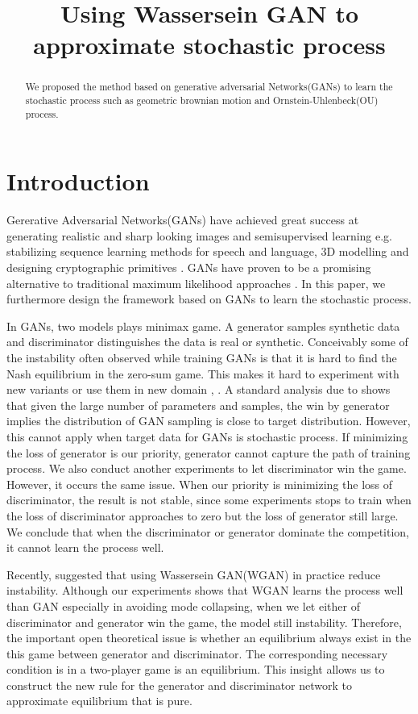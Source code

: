 \documentclass{article}
\title{Using Wassersein GAN to approximate stochastic process}
\begin{document}
	\maketitle
	\begin{abstract}
		We proposed the method based on generative adversarial Networks(GANs)
		to learn the stochastic process such as geometric brownian motion and Ornstein-Uhlenbeck(OU) process.
	\end{abstract}
		\section{Introduction}
		Gererative Adversarial Networks(GANs) have achieved great success at generating realistic and sharp looking images and semisupervised learning e.g. stabilizing sequence learning methods for speech and language, 3D modelling and designing cryptographic primitives \cite{abadi} \cite{sarmad} \cite{tevet} \cite{fedus2018maskgan}. 
		GANs have proven to be a promising alternative to traditional maximum likelihood approaches \cite{huszr2015train}.
		In this paper, we furthermore design the framework based on GANs to learn the stochastic process.
		
		In GANs, two models plays minimax game. 
		A generator samples synthetic data and discriminator distinguishes the data is real or synthetic.
		Conceivably some of the instability often observed while training GANs is that it is hard to find the Nash equilibrium in the zero-sum game. 
		This makes it hard to experiment with new variants or use them in new domain \cite{martin_arjovsky} \cite{arora2017gans} \cite{arora}, \cite{grnarova}.
		A standard analysis due to \cite{goodfellow} shows that given the large number of parameters and samples, the win by generator implies the distribution of GAN sampling is close to target distribution.
		However, this cannot apply when target data for GANs is stochastic process.
		If minimizing the loss of generator is our priority, generator cannot capture the path of training process.
		We also conduct another experiments to let discriminator win the game.
		However, it occurs the same issue.
		When our priority is minimizing the loss of discriminator, the result is not stable, 
		since some experiments stops to train when the loss of discriminator approaches to zero but the loss of generator still large.
		We conclude that when the discriminator or generator dominate the competition, it cannot learn the process well.
		
		Recently, \cite{arjovsky} \cite{xiao} suggested that using Wassersein GAN(WGAN) in practice reduce instability. 
		Although our experiments shows that WGAN learns the process well than GAN especially in avoiding mode collapsing, when we let either of discriminator and generator win the game, the model still instability.
		Therefore, the important open theoretical issue is whether an equilibrium always exist in the this game between generator and discriminator.
		The corresponding necessary condition is in a two-player game is an equilibrium.
		This insight allows us to construct the new rule for the generator and discriminator network to approximate equilibrium that is pure. 
		
\end{document}
